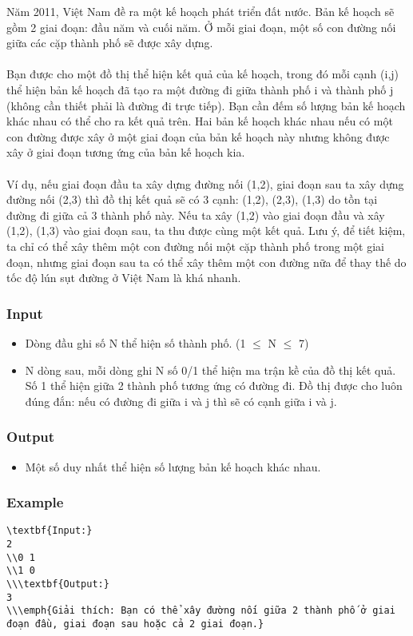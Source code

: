 



   Năm 2011, Việt Nam đề ra một kế hoạch phát triển đất nước. Bản kế hoạch sẽ gồm 2 giai đoạn: đầu năm và cuối năm. Ở mỗi giai đoạn, một số con đường nối giữa các cặp thành phố sẽ được xây dựng.   
\\
\\   Bạn được cho một đồ thị thể hiện kết quả của kế hoạch, trong đó mỗi cạnh (i,j) thể hiện bản kế hoạch đã tạo ra một đường đi giữa thành phố i và thành phố j (không cần thiết phải là đường đi trực tiếp). Bạn cần đếm số lượng bản kế hoạch khác nhau có thể cho ra kết quả trên. Hai bản kế hoạch khác nhau nếu có một con đường được xây ở một giai đoạn của bản kế hoạch này nhưng không được xây ở giai đoạn tương ứng của bản kế hoạch kia.   
\\
\\   Ví dụ, nếu giai đoạn đầu ta xây dựng đường nối (1,2), giai đoạn sau ta xây dựng đường nối (2,3) thì đồ thị kết quả sẽ có 3 cạnh: (1,2), (2,3), (1,3) do tồn tại đường đi giữa cả 3 thành phố này. Nếu ta xây (1,2) vào giai đoạn đầu và xây (1,2), (1,3) vào giai đoạn sau, ta thu được cùng một kết quả. Lưu ý, để tiết kiệm, ta chỉ có thể xây thêm một con đường nối một cặp thành phố trong một giai đoạn, nhưng giai đoạn sau ta có thể xây thêm một con đường nữa để thay thế do tốc độ lún sụt đường ở Việt Nam là khá nhanh.  

\subsubsection{   Input  }
\begin{itemize}
	\item     Dòng đầu ghi số N thể hiện số thành phố. (1  $\le$  N  $\le$  7)   
\end{itemize}
\begin{itemize}
	\item     N dòng sau, mỗi dòng ghi N số 0/1 thể hiện ma trận kề của đồ thị kết quả. Số 1 thể hiện giữa 2 thành phố tương ứng có đường đi. Đồ thị được cho luôn đúng đắn: nếu có đường đi giữa i và j thì sẽ có cạnh giữa i và j.   
\end{itemize}

\subsubsection{   Output  }
\begin{itemize}
	\item     Một số duy nhất thể hiện số lượng bản kế hoạch khác nhau.   
\end{itemize}

\subsubsection{   Example  }
\begin{verbatim}
\textbf{Input:}
2
\\0 1
\\1 0
\\\textbf{Output:}
3
\\\emph{Giải thích: Bạn có thể xây đường nối giữa 2 thành phố ở giai đoạn đầu, giai đoạn sau hoặc cả 2 giai đoạn.}\end{verbatim}
